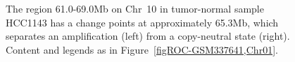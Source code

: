 \documentclass{bioinfo}
\begin{document}
\begin{figure}[!tpbh]
\begin{center}
  \\
  \\
\end{center}
 \caption{
  The region 61.0-69.0Mb on Chr~10 in tumor-normal sample HCC1143 has a change points at approximately 65.3Mb, which separates an amplification (left) from a copy-neutral state (right).
  Content and legends as in Figure~\ref{figROC-GSM337641,Chr01}.
 }
 \label{figROC-GSM337641,Chr10}
\end{figure} 


\end{document}
